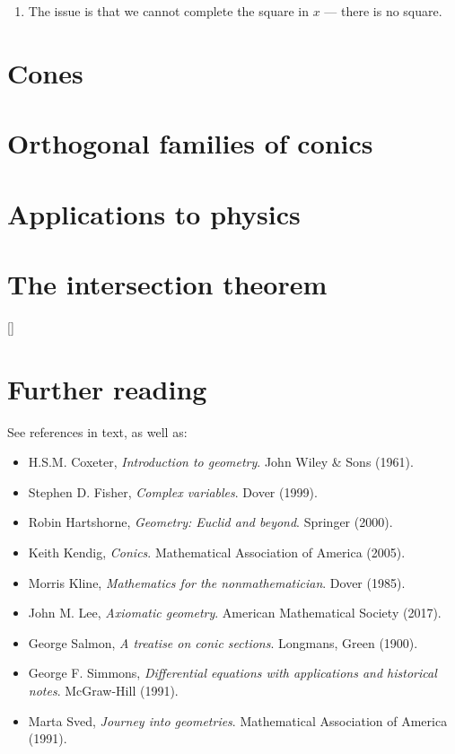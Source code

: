 \documentclass[a4paper,leqno,10pt]{article}
\theoremstyle{exercise}
\theoremstyle{plain}
\theoremstyle{definition}
\theoremstyle{remark}
\begin{document}
\begin{enumerate}
  \item The issue is that we cannot complete the square in $ x $ --- there is no square.
\end{enumerate}


\section{Cones}

\section{Orthogonal families of conics}

\section{Applications to physics}

\section{The intersection theorem}

\appendix
{}[{\titlerule[0.8pt]}]
\section{Further reading}
See references in text, as well as:
\begin{itemize}
  \item H.S.M. Coxeter, \emph{Introduction to geometry}. John Wiley \& Sons (1961).
  \item Stephen D. Fisher, \emph{Complex variables}. Dover (1999).
  \item Robin Hartshorne, \emph{Geometry: Euclid and beyond}. Springer (2000).
  \item Keith Kendig, \emph{Conics}. Mathematical Association of America (2005).
  \item Morris Kline, \emph{Mathematics for the nonmathematician}. Dover (1985).
  \item John M. Lee, \emph{Axiomatic geometry}. American Mathematical Society (2017).
  \item George Salmon, \emph{A treatise on conic sections}. Longmans, Green (1900).
  \item George F. Simmons, \emph{Differential equations with applications and historical notes}. McGraw-Hill (1991).
  \item Marta Sved, \emph{Journey into geometries}. Mathematical Association of America (1991).
\end{itemize}
\end{document}
